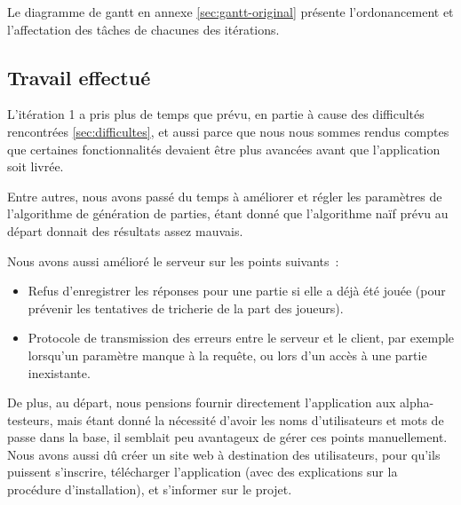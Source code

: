\documentclass[a4paper,11pt,french]{article}
\begin{document}
Le diagramme de gantt en annexe \ref{sec:gantt-original} présente l'ordonancement et l'affectation des tâches de chacunes des itérations.

\subsection{Travail effectué}

L'itération 1 a pris plus de temps que prévu, en partie à cause des difficultés rencontrées \ref{sec:difficultes}, et aussi parce que nous
nous sommes rendus comptes que certaines fonctionnalités devaient être plus avancées avant que l'application soit livrée.

Entre autres, nous avons passé du temps à améliorer et régler les paramètres de l'algorithme de génération de parties, étant donné que
l'algorithme naïf prévu au départ donnait des résultats assez mauvais.

Nous avons aussi amélioré le serveur sur les points suivants~:
\begin{itemize}
\item Refus d'enregistrer les réponses pour une partie si elle a déjà été jouée (pour prévenir les tentatives de tricherie de la part des joueurs).
\item Protocole de transmission des erreurs entre le serveur et le client, par exemple lorsqu'un paramètre manque à la requête, ou lors d'un
  accès à une partie inexistante.
\end{itemize}

De plus, au départ, nous pensions fournir directement l'application aux alpha-testeurs, mais étant donné la nécessité d'avoir les noms d'utilisateurs
et mots de passe dans la base, il semblait peu avantageux de gérer ces points manuellement. Nous avons aussi dû créer un site web à destination
des utilisateurs, pour qu'ils puissent s'inscrire, télécharger l'application (avec des explications sur la procédure d'installation), et
s'informer sur le projet.
\end{document}

